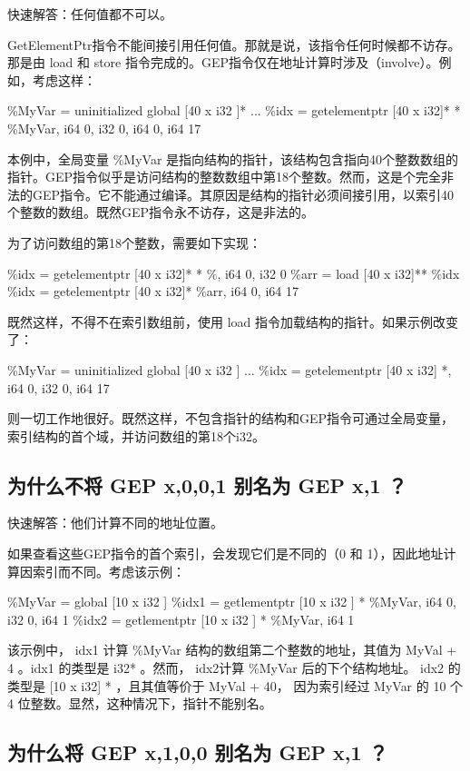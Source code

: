 \documentclass[12pt,a4paper]{article}
\begin{document}
快速解答：任何值都不可以。

GetElementPtr指令不能间接引用任何值。那就是说，该指令任何时候都不访存。那是由 load 和 store 指令完成的。GEP指令仅在地址计算时涉及（involve）。例如，考虑这样：

\%MyVar = uninitialized global { [40 x i32 ]* }
...
\%idx = getelementptr { [40 x i32]* }* \%MyVar, i64 0, i32 0, i64 0, i64 17

本例中，全局变量 \%MyVar 是指向结构的指针，该结构包含指向40个整数数组的指针。GEP指令似乎是访问结构的整数数组中第18个整数。然而，这是个完全非法的GEP指令。它不能通过编译。其原因是结构的指针必须间接引用，以索引40个整数的数组。既然GEP指令永不访存，这是非法的。

为了访问数组的第18个整数，需要如下实现：

\%idx = getelementptr { [40 x i32]* }* \%, i64 0, i32 0
\%arr = load [40 x i32]** \%idx
\%idx = getelementptr [40 x i32]* \%arr, i64 0, i64 17

既然这样，不得不在索引数组前，使用 load 指令加载结构的指针。如果示例改变了：

\%MyVar = uninitialized global { [40 x i32 ] }
...
\%idx = getelementptr { [40 x i32] }*, i64 0, i32 0, i64 17

则一切工作地很好。既然这样，不包含指针的结构和GEP指令可通过全局变量，索引结构的首个域，并访问数组的第18个i32。

\subsection{为什么不将 GEP x,0,0,1 别名为 GEP x,1 ？}

快速解答：他们计算不同的地址位置。

如果查看这些GEP指令的首个索引，会发现它们是不同的（0 和 1），因此地址计算因索引而不同。考虑该示例：

\%MyVar = global { [10 x i32 ] }
\%idx1 = getlementptr { [10 x i32 ] }* \%MyVar, i64 0, i32 0, i64 1
\%idx2 = getlementptr { [10 x i32 ] }* \%MyVar, i64 1

该示例中， idx1 计算 \%MyVar 结构的数组第二个整数的地址，其值为 MyVal + 4 。idx1 的类型是 i32* 。然而， idx2计算 \%MyVar 后的下个结构地址。 idx2 的类型是 { [10 x i32] }* ，且其值等价于 MyVal + 40， 因为索引经过 MyVar 的 10 个 4 位整数。显然，这种情况下，指针不能别名。

\subsection{为什么将 GEP x,1,0,0 别名为 GEP x,1 ？}
\end{document}

